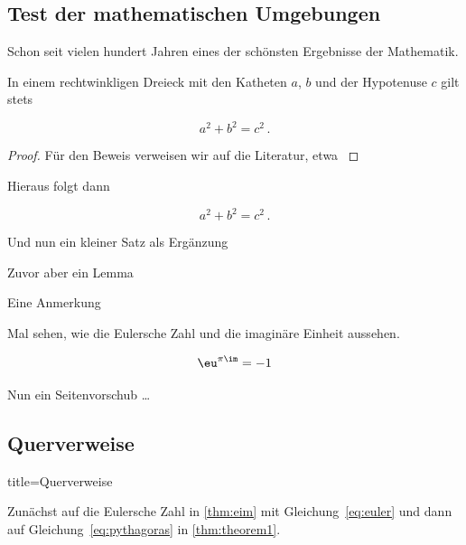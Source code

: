 \subsection{Test der mathematischen Umgebungen}\label{subsec:mumgebungen}
Schon seit vielen hundert Jahren eines der schönsten Ergebnisse der Mathematik.
%
\begin{theorem}\label{thm:theorem1}
In einem rechtwinkligen Dreieck mit den Katheten $ a $, $ b $ und der Hypotenuse $ c $ gilt stets

\begin{equation}\label{eq:pythagoras}
	a^{ 2 } + b^{ 2 } = c^{ 2 } \, .
\end{equation}
\end{theorem}
%
\begin{proof}
Für den Beweis verweisen wir auf die Literatur, etwa \textcite{efhn:2016}
\end{proof}
\begin{corollary}\label{cor:pythagoras}
Hieraus folgt dann 

\[
	a^{ 2 } + b^{ 2 } = c^{ 2 } \, .
\]
%


\end{corollary}
%
\begin{proposition}\label{prop:prop}
Und nun ein kleiner Satz als Ergänzung 
\end{proposition}
%
\begin{lemma}
Zuvor aber ein Lemma
\end{lemma}
%
\begin{remark}
Eine Anmerkung
\end{remark}
Mal sehen, wie die Eulersche Zahl und die imaginäre Einheit aussehen.
\begin{theorem}\label{thm:eim}
\begin{equation}\label{eq:euler}
\eu^{ \pi \im } = -1 
\end{equation}
\end{theorem}
Nun ein Seitenvorschub \ldots
%
\newpage
\subsection{Querverweise}\label{subsec:referenzen}

\begin{dispExample*}{title=Querverweise}
\end{dispExample*}
%
Zunächst auf die Eulersche Zahl in \vref{thm:eim} mit Gleichung~\eqref{eq:euler} und dann auf Gleichung~\eqref{eq:pythagoras} in \vref{thm:theorem1}.
%
